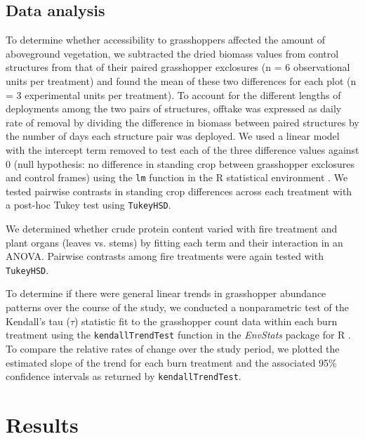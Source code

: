 \documentclass[referee, 
	            sn-basic]
           {sn-jnl}
\begin{document}
\subsection{Data analysis}

To determine whether accessibility to grasshoppers affected the amount of aboveground vegetation, we subtracted the dried biomass values from control structures from that of their paired grasshopper exclosures (n = 6 observational units per treatment) and found the mean of these two differences for each plot (n = 3 experimental units per treatment). 
To account for the different lengths of deployments among the two pairs of structures, offtake was expressed as daily rate of removal by dividing the difference in biomass between paired structures by the number of days each structure pair was deployed.  
We used a linear model with the intercept term removed to test each of the three difference values against 0 (null hypothesis: no difference in standing crop between grasshopper exclosures and control frames) using the \texttt{lm} function in the \textsf{R} statistical environment \citep{Rcore2020}. 
We tested pairwise contrasts in standing crop differences across each treatment with a post-hoc Tukey test using \texttt{TukeyHSD}.

We determined whether crude protein content varied with fire treatment and plant organs (leaves vs. stems) by fitting each term and their interaction in an ANOVA.
Pairwise contrasts among fire treatments were again tested with \texttt{TukeyHSD}.

To determine if there were general linear trends in grasshopper abundance patterns over the course of the study, we conducted a nonparametric test of the Kendall's tau (\(\tau\)) statistic fit to the grasshopper count data within each burn treatment using the \texttt{kendallTrendTest} function in the \emph{EnvStats} package for
\textsf{R} \citep{millard2013}.
To compare the relative rates of change over the study period, we plotted the estimated slope of the trend for each burn treatment and the associated 95\% confidence intervals as returned by \texttt{kendallTrendTest}.

\section{Results}
\end{document}
